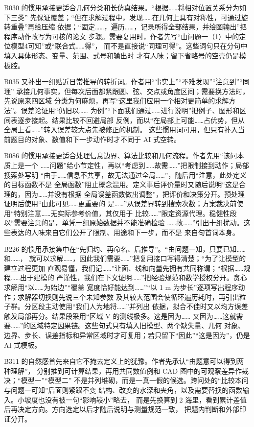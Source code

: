 B030 的惯用承接更适合几何分类和长仿真结果。“根据……将相对位置关系分为如下三类”
先保证覆盖；“但在求解过程中，发现……在几何上具有对称性，可通过旋转重叠”再给压缩
依据；“固定……，遍历……，记录所得全部结果，并绘图输出”把程序动作改写为可核的论文
步骤。需要复用时，作者先写“由问题一（1）中的定位模型4可知”或“联合式……得”，
而不是直接说“同理可得”。这些词句只在分句中填入具体形态、变量、范围、式号和输出时
才有人味；留下省略号的空壳仍是模板腔。

B035 又补出一组贴近日常推导的转折词。作者用“事实上”“不难发现”“注意到”“同理”
承接几何事实，但每次后面都紧跟圆、弦、交点或角度区间；需要换方法时，先说原来四区域
分类为何麻烦，再写“这里我们应用一个相对更简单的求解方法”。误差论证用“仍旧以……
为例”“下面我们通过……进行说明”把例子、图形和区间表逐步接起。结果比较不回避局部
反例，而以“在局部上可能……占优势，但从全局上看……”转入误差较大点先被修正的机制。
这些惯用词可用，但只有补入当前题目的对象、数值和下一步动作时才不同于 AI 式空转。

B086 的惯用承接更适合处理信息边界、算法比较和几何流程。作者先用“该问本质上是一个
……问题”给小节定性，再以“考虑到……故需……”把限制接到动作；局部搜索处写明
“由于……信息不共享，故无法通过全局……”，随后用“注意，此处定义的目标函数不是
全局函数”阻止概念混用。定义事后评价量时又随后说明“这是合理的，因为……并没有根据
全局误差函数做出调整”，把评价和决策分开。预处理证明后使用“由此可见……更重要的
是……”从误差界转到搜索次数；方案裁决前使用“特别注意……无实际参考价值，其仅用于
比较……”限定资源代理。稳健性段以“需要注意的是，单凭一组原始数据并不能准确检验
……故……”引出十组扰动。这些表达的人味来自它们公开了限制、用途和下一步，而不是
来自句首词本身。

B226 的惯用承接集中在“先归约、再命名、后推导”。“由问题一知，只要已知……和……，
就可以求解……，因此我们需要……”把复用接口写得清楚；“为了让模型的建立过程更加
直观易懂，我们记……”让面、线和向量先拥有共同称谓；“根据……规程……出于建模的
严谨性，我们在下文证明……”把经验规范和数学授权分开。贪心求解用“以……为始边”“覆盖
宽度恰好能达到……”“以 1 m 为步长”逐项写出程序动作；求解器切换则先说三个未知参数
及其较大范围会使循环遍历耗时，再引出粒子群。分区段主动使用“我们人为地将……”并列出
依据，拟合不佳时又以均方误差触发局部再分。结果段采用“区域 V 的测线极多。这是因为……
又因为……这就需要……”的区域特定因果链。这些句式只有填入旧模型、两个缺失量、几何
对象、边界、步长、误差指标和异常区域时才可复用；若只留下“因此”“这是因为”，仍是 AI
式模板。

B311 的自然感首先来自它不掩去定义上的犹豫。作者先承认“由题意可以得到两种理解”，
分别推到可计算结果，再用共同数值例和 CAD 图中的可观察差异作裁决；“模型一”“模型二”
不是并列堆砌，而是一真一假的候选。跨问处的“比较本问与问题一可知”后面则紧跟不变
结构、改变的水深和夹角，以及需要替换的函数输入。小坡度也没有被一句“影响较小”略去，
而是先换算到 2 海里，看到累计差值后再决定方向。方向选定以后才随后说明与测量规范一致，
把题内判断和外部印证分开。


